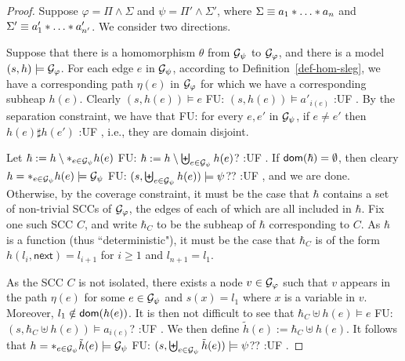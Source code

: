 \documentclass{llncs}
\newcommand{\fu}[1]{\color{purple} {FU: #1 :UF} \color{black}}
\begin{document}
\begin{proof} Suppose $\varphi=\Pi \wedge \Sigma$
and $\psi=\Pi'\wedge \Sigma'$, where $\Sigma\equiv a_1 \sep \dots \sep a_n$ and $\Sigma'\equiv a_1' \sep \dots \sep a'_{n'}$. We consider two directions.

Suppose that there is a homomorphism $\theta$ from $\mathcal{G}_\psi$ to $\mathcal{G}_\varphi$, and there is a model $(s, h)\models \mathcal{G}_\varphi$. For each edge $e$ in $\mathcal{G}_\psi$, according to Definition~\ref{def-hom-sleg}, we have a corresponding path $\eta(e)$ in $\mathcal{G}_\varphi$ for which we have a corresponding subheap $h(e)$. Clearly $(s, h(e))\models e$ \fu{$(s, h(e))\models a'_{i(e)}$}.  By the separation constraint, we have that \fu{ for every $e,e'$ in $\mathcal{G}_\psi$, if $e\neq e'$ then $h(e)\sharp h(e')$}, i.e., they are domain disjoint.

Let $\hbar:=h\setminus \ast_{e\in \mathcal{G}_\psi} h(e)$ \fu{$\hbar:=h\setminus \biguplus_{e\in \mathcal{G}_\psi} h(e)$?}. If ${\sf dom}(\hbar)=\emptyset$, then cleary $h= \ast_{e\in \mathcal{G}_\psi} h(e)\models \mathcal{G}_\psi$ \fu{$(s,\biguplus_{e\in \mathcal{G}_\psi} h(e))\models \psi$?? }, and we are done. Otherwise, by the coverage constraint, it must be the case that $\hbar$ contains a set of non-trivial SCCs of $\mathcal{G}_\varphi$,  the edges of each of which are all included in $\hbar$. Fix one such SCC $C$, and write $\hbar_C$ to be the subheap of $\hbar$ corresponding to $C$. As $\hbar$ is a function (thus ``deterministic"), it must be the case that $\hbar_C$ is of the form $h(l_i, \mathsf{next})=l_{i+1}$ for $i\geq 1$ and $l_{n+1}= l_1$.

As the SCC $C$ is not isolated, there exists a node $v\in \mathcal{G}_\varphi$ such that $v$ appears in the path $\eta(e)$ for some $e\in \mathcal{G}_\psi$ and $s(x)=l_1$ where $x$ is a variable in $v$. Moreover, $l_1\notin {\sf dom}(h(e))$. It is then not difficult to see that  $\hbar_C\uplus h(e)\models e$ \fu{$(s,\hbar_C\uplus h(e))\models a_{i(e)}$?}.  We then define $\tilde{h}(e):= \hbar_C\uplus h(e)$. It follows that
$h= \ast_{e\in \mathcal{G}_\psi} \tilde{h}(e)\models \mathcal{G}_\psi$ \fu{$(s,\biguplus_{e\in \mathcal{G}_\psi} \tilde{h}(e))\models \psi$??}.





\end{proof}
\end{document}
